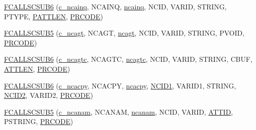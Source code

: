 \begin{DoxyCompactItemize}
\item 
\hyperlink{fort-v2compat_8c_a085b44bd926969302b555c1263702ae0}{F\+C\+A\+L\+L\+S\+C\+S\+U\+B6} (\hyperlink{nf__v2compat_8c_ae2fadfcdf2633389b29b14f4bf7e62b2}{c\+\_\+ncainq}, N\+C\+A\+I\+NQ, \hyperlink{nf__fortv2_8f90_a7b0621bf96d56601f68c18da4ff2e759}{ncainq}, N\+C\+ID, V\+A\+R\+ID, S\+T\+R\+I\+NG, P\+T\+Y\+PE, \hyperlink{fort-v2compat_8c_abba4da455082c98d8b81b6d70ff498de}{P\+A\+T\+T\+L\+EN}, \hyperlink{fort-v2compat_8c_ae2352f39cbd25bcaf1bedbbb12db73fe}{P\+R\+C\+O\+DE})
\item 
\hyperlink{fort-v2compat_8c_a8926daf7c832748512514c9a4f754a12}{F\+C\+A\+L\+L\+S\+C\+S\+U\+B5} (\hyperlink{nf__v2compat_8c_a35655edb0fac8162f977d59dd904adf2}{c\+\_\+ncagt}, N\+C\+A\+GT, \hyperlink{nf__fortv2_8f90_a12c954aa7ec21768adf357a69850aa8e}{ncagt}, N\+C\+ID, V\+A\+R\+ID, S\+T\+R\+I\+NG, P\+V\+O\+ID, \hyperlink{fort-v2compat_8c_ae2352f39cbd25bcaf1bedbbb12db73fe}{P\+R\+C\+O\+DE})
\item 
\hyperlink{fort-v2compat_8c_ac622f0104673733887ae0c1af938f237}{F\+C\+A\+L\+L\+S\+C\+S\+U\+B6} (\hyperlink{nf__v2compat_8c_af2970c38a778d0445024e98efe3ae008}{c\+\_\+ncagtc}, N\+C\+A\+G\+TC, \hyperlink{nf__fortv2_8f90_acdffb4e9e53796cfadcf86a802a159b3}{ncagtc}, N\+C\+ID, V\+A\+R\+ID, S\+T\+R\+I\+NG, C\+B\+UF, \hyperlink{fort-v2compat_8c_a5274f0ce0562c9ab9da4004e7d85d738}{A\+T\+T\+L\+EN}, \hyperlink{fort-v2compat_8c_ae2352f39cbd25bcaf1bedbbb12db73fe}{P\+R\+C\+O\+DE})
\item 
\hyperlink{fort-v2compat_8c_a344033c85730782d2917dbe854fe83ac}{F\+C\+A\+L\+L\+S\+C\+S\+U\+B6} (\hyperlink{nf__v2compat_8c_a3130c6d2dee74a8b7bdfc7dc72e5bdf4}{c\+\_\+ncacpy}, N\+C\+A\+C\+PY, \hyperlink{nf__fortv2_8f90_a251a629393e35281e714774eddea2551}{ncacpy}, \hyperlink{ncfortran_8h_a77bc5b6e6321a310e41121867f2e999e}{N\+C\+I\+D1}, V\+A\+R\+I\+D1, S\+T\+R\+I\+NG, \hyperlink{ncfortran_8h_afc3f5dd7cd297678e0066bb7e2d3fcb4}{N\+C\+I\+D2}, V\+A\+R\+I\+D2, \hyperlink{fort-v2compat_8c_ae2352f39cbd25bcaf1bedbbb12db73fe}{P\+R\+C\+O\+DE})
\item 
\hyperlink{fort-v2compat_8c_a8bd30481b6c02713c36110489bc583c3}{F\+C\+A\+L\+L\+S\+C\+S\+U\+B5} (\hyperlink{nf__v2compat_8c_aeeeb1daf5d2fbc85f3d7135d723e6198}{c\+\_\+ncanam}, N\+C\+A\+N\+AM, \hyperlink{nf__fortv2_8f90_abd5c8126f5ad1171b3944262956899b0}{ncanam}, N\+C\+ID, V\+A\+R\+ID, \hyperlink{ncfortran_8h_a01d1fad6578e98ab92205f3da4b446dc}{A\+T\+T\+ID}, P\+S\+T\+R\+I\+NG, \hyperlink{fort-v2compat_8c_ae2352f39cbd25bcaf1bedbbb12db73fe}{P\+R\+C\+O\+DE})
\item 

\end{DoxyCompactItemize}
